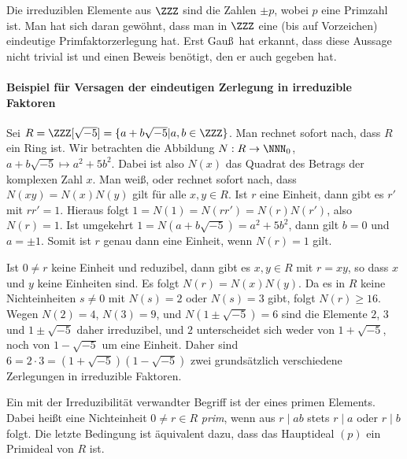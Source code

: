 \documentclass[12pt,a4paper,twoside]{article}
\newcommand{\ei}[1]{\emph{#1}\index{#1}}
\begin{document}
Die irreduziblen Elemente aus
$\ZZZ$ sind die Zahlen $\pm p$, wobei $p$ eine Primzahl ist. Man hat sich
daran gew\"ohnt, dass man in $\ZZZ$ eine (bis auf Vorzeichen) eindeutige
Primfaktorzerlegung hat. Erst Gau\ss\ hat erkannt, dass diese Aussage nicht
trivial ist und einen Beweis ben\"otigt, den er auch gegeben hat.
\paragraph{Beispiel f\"ur Versagen der eindeutigen Zerlegung in irreduzible
  Faktoren}
Sei $R=\ZZZ[\sqrt{-5}]=\{a+b\sqrt{-5}|a,b\in\ZZZ\}$. Man rechnet sofort nach,
dass $R$ ein Ring ist. Wir betrachten die Abbildung $N:R\to\NNN_0$,
$a+b\sqrt{-5}\mapsto a^2+5b^2$. Dabei ist also $N(x)$ das Quadrat des Betrags
der komplexen Zahl $x$. Man wei\ss, oder rechnet sofort nach, dass
$N(xy)=N(x)N(y)$ gilt f\"ur alle $x,y\in R$. Ist $r$ eine Einheit, dann gibt
es $r'$ mit $rr'=1$. Hieraus folgt $1=N(1)=N(rr')=N(r)N(r')$, also
$N(r)=1$. Ist umgekehrt $1=N(a+b\sqrt{-5})=a^2+5b^2$, dann gilt $b=0$ und
$a=\pm1$. Somit ist $r$ genau dann eine Einheit, wenn $N(r)=1$ gilt.

Ist $0\ne r$ keine Einheit und reduzibel, dann gibt es $x,y\in R$ mit $r=xy$,
so dass $x$ und $y$ keine Einheiten sind. Es folgt $N(r)=N(x)N(y)$. Da es in
$R$ keine Nichteinheiten $s\ne0$ mit $N(s)=2$ oder $N(s)=3$ gibt, folgt
$N(r)\ge16$. Wegen $N(2)=4$, $N(3)=9$, und $N(1\pm\sqrt{-5})=6$ sind die
Elemente $2$, $3$ und $1\pm\sqrt{-5}$ daher irreduzibel, und $2$ unterscheidet
sich weder von $1+\sqrt{-5}$, noch von $1-\sqrt{-5}$ um eine Einheit. Daher
sind $6=2\cdot3=(1+\sqrt{-5})(1-\sqrt{-5})$ zwei grunds\"atzlich verschiedene
Zerlegungen in irreduzible Faktoren.

Ein mit der Irreduzibilit\"at verwandter Begriff ist der eines primen
Elements. Dabei hei\ss t eine Nichteinheit $0\ne r\in R$ \ei{prim}, wenn aus
$r\mid ab$ stets $r\mid a$ oder $r\mid b$ folgt. Die letzte Bedingung ist
\"aquivalent dazu, dass das Hauptideal $(p)$ ein Primideal von $R$ ist.
\end{document}
